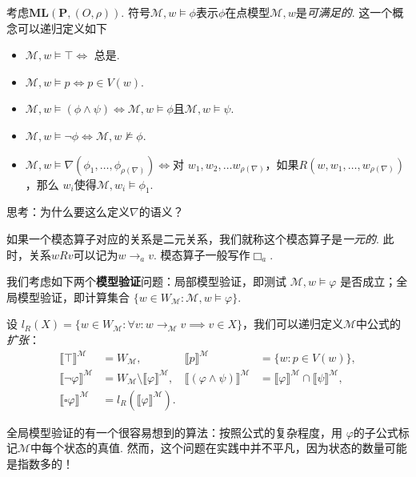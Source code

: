 \begin{definition}
    考虑$\mathbf{ML}(\mathbf{P},(O,\rho))$. 符号$\mathcal M,w\vDash\phi$表示$\phi$在点模型$\mathcal M,w$是\emph{可满足的}. 这一个概念可以递归定义如下
    \begin{itemize}
        \item $\mathcal M, w\vDash\top\iff$ 总是.
        \item $\mathcal M, w\vDash p\iff p\in V(w)$.
        \item $\mathcal M, w\vDash (\phi\wedge\psi)\iff\mathcal M,w\vDash\phi$且$\mathcal M,w\vDash\psi$.
        \item $\mathcal M, w\vDash \neg\phi\iff\mathcal M,w\not\vDash\phi$.
        \item $\mathcal M, w\vDash \nabla(\phi_1,\dots,\phi_{\rho(\nabla)})\iff$对 $w_1,w_2,\dots w_{\rho(\nabla)}$，如果$R(w,w_1,\dots,w_{\rho(\nabla)})$，那么 $w_i$使得$\mathcal M,w_i\vDash\phi_1$.
    \end{itemize}
\end{definition}

思考：为什么要这么定义$\nabla$的语义？

如果一个模态算子对应的关系是二元关系，我们就称这个模态算子是\emph{一元的}. 此时，关系$wRv$可以记为$w\to_a v$. 模态算子一般写作$\Box_a$.


\begin{remark}[模型验证]
我们考虑如下两个\textbf{模型验证}问题：局部模型验证，即测试 $\mathcal M,w \vDash \varphi$ 是否成立；全局模型验证，即计算集合 $\{w \in W_{\mathcal M} : \mathcal M,w \vDash \varphi\}$.

设 $l_R(X) = \{w \in W_{\mathcal M} : \forall v : w \to_{\mathcal M} v \implies v \in X\}$，我们可以递归定义$\mathcal M$中公式的\emph{扩张}：
\[\begin{array}{rlrl}\llbracket \top \rrbracket^{\mathcal{M}} & =W_{\mathcal{M}}, & \llbracket p \rrbracket^{\mathcal{M}} & =\{w : p \in V(w)\}, \\ 
\llbracket \neg \varphi \rrbracket^{\mathcal{M}} & =W_{\mathcal M}\setminus \llbracket \varphi \rrbracket^{\mathcal{M}}, & \llbracket(\varphi \wedge \psi) \rrbracket^{\mathcal{M}} & =\llbracket \varphi \rrbracket^{\mathcal{M}} \cap \llbracket \psi \rrbracket^{\mathcal{M}}, \\
\llbracket \square \varphi \rrbracket^{\mathcal{M}} & =l_R\left(\llbracket \varphi \rrbracket^{\mathcal{M}}\right).\end{array}\]

全局模型验证的有一个很容易想到的算法：按照公式的复杂程度，用 $\varphi$的子公式标记$\mathcal M$中每个状态的真值. 然而，这个问题在实践中并不平凡，因为状态的数量可能是指数多的！
\end{remark}

